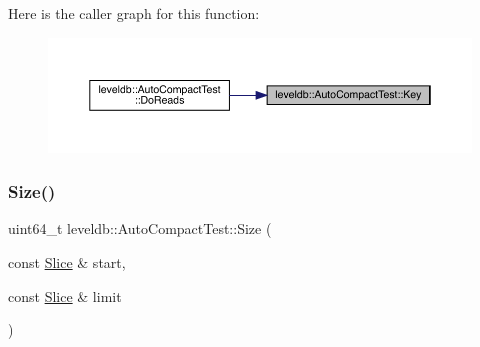Here is the caller graph for this function\+:
\nopagebreak
\begin{figure}[H]
\begin{center}
\leavevmode
\includegraphics[width=350pt]{classleveldb_1_1_auto_compact_test_a02993bed0b92d580bb0a51b92191eba9_icgraph}
\end{center}
\end{figure}
\mbox{\label{classleveldb_1_1_auto_compact_test_a4be489ee1b3868f61d9976935e9b2bc4}} 
\subsubsection{\texorpdfstring{Size()}{Size()}}
{\footnotesize\ttfamily uint64\+\_\+t leveldb\+::\+Auto\+Compact\+Test\+::\+Size (\begin{DoxyParamCaption}\item[{const \mbox{\hyperlink{classleveldb_1_1_slice}{Slice}} \&}]{start,  }\item[{const \mbox{\hyperlink{classleveldb_1_1_slice}{Slice}} \&}]{limit }\end{DoxyParamCaption})\hspace{0.3cm}{\ttfamily [inline]}}

